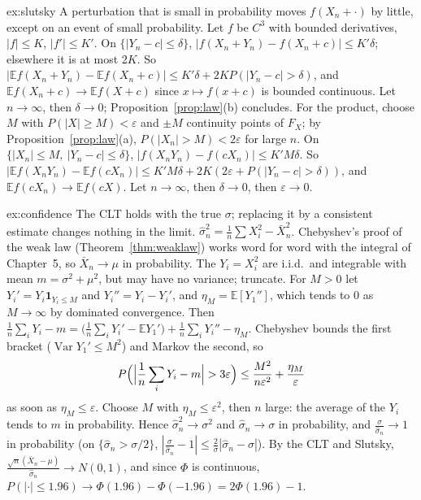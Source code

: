 \begin{solution}{ex:slutsky}
\idea A perturbation that is small in probability moves $f(X_n+\cdot)$ by little, except on an event of small probability.
\writeup Let $f$ be $C^3$ with bounded derivatives, $|f|\le K$, $|f'|\le K'$. On $\{|Y_n-c|\le\delta\}$, $|f(X_n+Y_n)-f(X_n+c)|\le K'\delta$; elsewhere it is at most $2K$.
So $|\mathbb E f(X_n+Y_n)-\mathbb E f(X_n+c)|\le K'\delta+2KP(|Y_n-c|>\delta)$, and $\mathbb E f(X_n+c)\to\mathbb E f(X+c)$ since $x\mapsto f(x+c)$ is bounded continuous. Let $n\to\infty$,
then $\delta\to0$; Proposition~\ref{prop:law}(b) concludes. For the product, choose $M$ with $P(|X|\ge M)<\varepsilon$ and $\pm M$ continuity points of $F_X$; by
Proposition~\ref{prop:law}(a), $P(|X_n|>M)<2\varepsilon$ for large $n$. On $\{|X_n|\le M,\ |Y_n-c|\le\delta\}$, $|f(X_nY_n)-f(cX_n)|\le K'M\delta$. So
$|\mathbb E f(X_nY_n)-\mathbb E f(cX_n)|\le K'M\delta+2K(2\varepsilon+P(|Y_n-c|>\delta))$, and $\mathbb E f(cX_n)\to\mathbb E f(cX)$. Let $n\to\infty$, then $\delta\to0$, then $\varepsilon\to0$.
\end{solution}

\begin{solution}{ex:confidence}
\idea The CLT holds with the true $\sigma$; replacing it by a consistent estimate changes nothing in the limit.
\writeup $\hat\sigma_n^2=\frac1n\sum X_i^2-\bar X_n^2$. Chebyshev's proof of the weak law (Theorem~\ref{thm:weaklaw}) works word for word with the integral of
Chapter~5, so $\bar X_n\to\mu$ in probability. The $Y_i=X_i^2$ are i.i.d.\ and integrable with mean $m=\sigma^2+\mu^2$, but may have no variance; truncate. For
$M>0$ let $Y_i'=Y_i\mathbf 1_{Y_i\le M}$ and $Y_i''=Y_i-Y_i'$, and $\eta_M=\mathbb E[Y_1'']$, which tends to $0$ as $M\to\infty$ by dominated convergence. Then
$\frac1n\sum_iY_i-m=\bigl(\frac1n\sum_iY_i'-\mathbb E Y_1'\bigr)+\frac1n\sum_iY_i''-\eta_M$. Chebyshev bounds the first bracket ($\operatorname{Var}Y_1'\le M^2$) and Markov the second, so
\[
P\Bigl(\Bigl|\frac1n\sum_iY_i-m\Bigr|>3\varepsilon\Bigr)\le\frac{M^2}{n\varepsilon^2}+\frac{\eta_M}\varepsilon
\]
as soon as $\eta_M\le\varepsilon$. Choose $M$ with $\eta_M\le\varepsilon^2$, then $n$ large: the average of the $Y_i$ tends to $m$ in probability. Hence $\hat\sigma_n^2\to\sigma^2$ and $\hat\sigma_n\to\sigma$ in probability, and $\frac\sigma{\hat\sigma_n}\to1$ in probability (on
$\{\hat\sigma_n>\sigma/2\}$, $|\frac\sigma{\hat\sigma_n}-1|\le\frac2\sigma|\hat\sigma_n-\sigma|$). By the CLT and Slutsky, $\frac{\sqrt n(\bar X_n-\mu)}{\hat\sigma_n}\to N(0,1)$, and since $\Phi$ is continuous,
$P(|\cdot|\le1.96)\to\Phi(1.96)-\Phi(-1.96)=2\Phi(1.96)-1$.
\end{solution}

